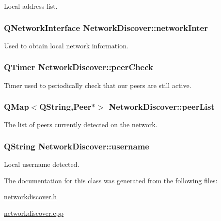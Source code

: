 \-Local address list. 

\hypertarget{class_network_discover_a67c037cca501b587cc8c24ab5d971553}{
\subsubsection[{network\-Inter}]{\setlength{\rightskip}{0pt plus 5cm}\-Q\-Network\-Interface {\bf \-Network\-Discover\-::network\-Inter}}}
\label{class_network_discover_a67c037cca501b587cc8c24ab5d971553}


\-Used to obtain local network information. 

\hypertarget{class_network_discover_ad23e0a7d95e0fed29acae8f193dfcfc3}{
\subsubsection[{peer\-Check}]{\setlength{\rightskip}{0pt plus 5cm}\-Q\-Timer {\bf \-Network\-Discover\-::peer\-Check}}}
\label{class_network_discover_ad23e0a7d95e0fed29acae8f193dfcfc3}


\-Timer used to periodically check that our peers are still active. 

\hypertarget{class_network_discover_ac7f0c8a7a8e780c83c24b4fa8cbbbfef}{
\subsubsection[{peer\-List}]{\setlength{\rightskip}{0pt plus 5cm}\-Q\-Map$<$\-Q\-String,{\bf \-Peer}$\ast$$>$ {\bf \-Network\-Discover\-::peer\-List}}}
\label{class_network_discover_ac7f0c8a7a8e780c83c24b4fa8cbbbfef}


\-The list of peers currently detected on the network. 

\hypertarget{class_network_discover_ad9dcef0352b63920211c0b442741bebb}{
\subsubsection[{username}]{\setlength{\rightskip}{0pt plus 5cm}\-Q\-String {\bf \-Network\-Discover\-::username}}}
\label{class_network_discover_ad9dcef0352b63920211c0b442741bebb}


\-Local username detected. 



\-The documentation for this class was generated from the following files\-:\begin{DoxyCompactItemize}
\item 
\hyperlink{networkdiscover_8h}{networkdiscover.\-h}\item 
\hyperlink{networkdiscover_8cpp}{networkdiscover.\-cpp}\end{DoxyCompactItemize}
